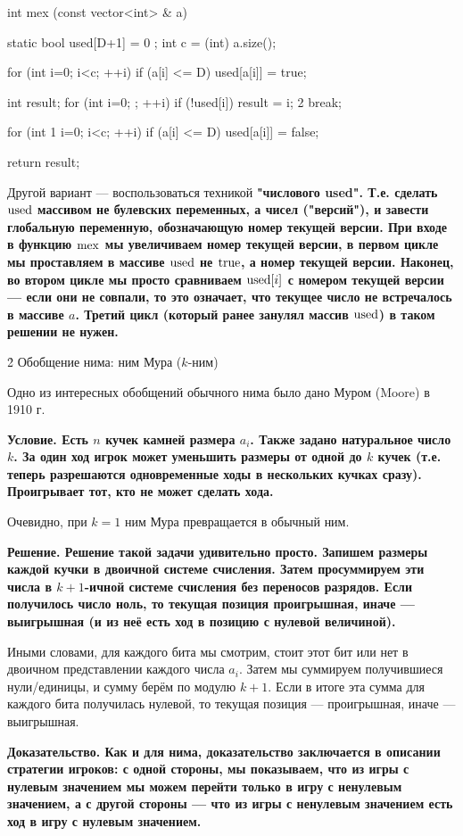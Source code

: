 \code
int mex (const vector<int> & a) {
	static bool used[D+1] = { 0 };
	int c = (int) a.size();

	for (int i=0; i<c; ++i)
		if (a[i] <= D)
			used[a[i]] = true;

	int result;
	for (int i=0; ; ++i)
		if (!used[i]) {
			result = i;
			 2 break;
		}

	for (int  1 i=0; i<c; ++i)
		if (a[i] <= D)
			used[a[i]] = false;

	return result;
}
\endcode

Другой вариант --- воспользоваться техникой \bf{"числового used"}. Т.е. сделать $\rm used$ массивом не булевских переменных, а чисел ("версий"), и завести глобальную переменную, обозначающую номер текущей версии. При входе в функцию $\rm mex$ мы увеличиваем номер текущей версии, в первом цикле мы проставляем в массиве $\rm used$ не $\rm true$, а номер текущей версии. Наконец, во втором цикле мы просто сравниваем ${\rm used}[i]$ с номером текущей версии --- если они не совпали, то это означает, что текущее число не встречалось в массиве $a$. Третий цикл (который ранее занулял массив $\rm used$) в таком решении не нужен.


\h2{ Обобщение нима: ним Мура ($k$-ним) }

Одно из интересных обобщений обычного нима было дано Муром (Moore) в 1910 г.

\bf{Условие}. Есть $n$ кучек камней размера $a_i$. Также задано натуральное число $k$. За один ход игрок может уменьшить размеры от одной до $k$ кучек (т.е. теперь разрешаются одновременные ходы в нескольких кучках сразу). Проигрывает тот, кто не может сделать хода.

Очевидно, при $k=1$ ним Мура превращается в обычный ним.

\bf{Решение}. Решение такой задачи удивительно просто. Запишем размеры каждой кучки в двоичной системе счисления. Затем просуммируем эти числа в $k+1$-ичной системе счисления без переносов разрядов. Если получилось число ноль, то текущая позиция проигрышная, иначе --- выигрышная (и из неё есть ход в позицию с нулевой величиной).

Иными словами, для каждого бита мы смотрим, стоит этот бит или нет в двоичном представлении каждого числа $a_i$. Затем мы суммируем получившиеся нули/единицы, и сумму берём по модулю $k+1$. Если в итоге эта сумма для каждого бита получилась нулевой, то текущая позиция --- проигрышная, иначе --- выигрышная.

\bf{Доказательство}. Как и для нима, доказательство заключается в описании стратегии игроков: с одной стороны, мы показываем, что из игры с нулевым значением мы можем перейти только в игру с ненулевым значением, а с другой стороны --- что из игры с ненулевым значением есть ход в игру с нулевым значением.

